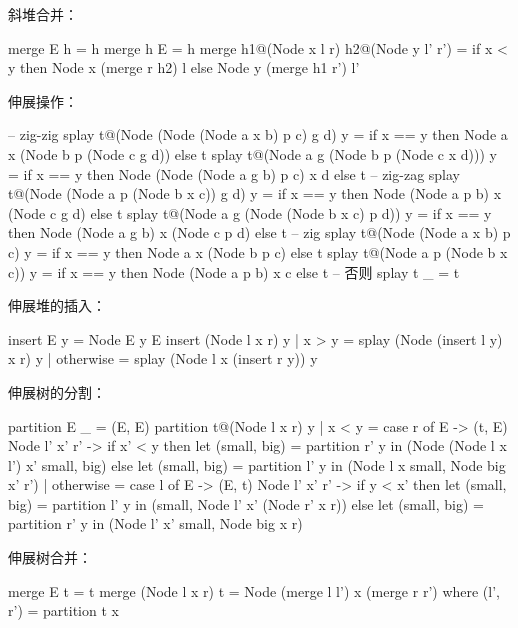 \documentclass[b5paper]{ctexart}
\begin{document}
斜堆合并：

\begin{Haskell}
merge E h = h
merge h E = h
merge h1@(Node x l r) h2@(Node y l' r') =
    if x < y then Node x (merge r h2) l
    else Node y (merge h1 r') l'
\end{Haskell}

伸展操作：

\begin{Haskell}
-- zig-zig
splay t@(Node (Node (Node a x b) p c) g d) y =
    if x == y then Node a x (Node b p (Node c g d)) else t
splay t@(Node a g (Node b p (Node c x d))) y =
    if x == y then Node (Node (Node a g b) p c) x d else t
-- zig-zag
splay t@(Node (Node a p (Node b x c)) g d) y =
    if x == y then Node (Node a p b) x (Node c g d) else t
splay t@(Node a g (Node (Node b x c) p d)) y =
    if x == y then Node (Node a g b) x (Node c p d) else t
-- zig
splay t@(Node (Node a x b) p c) y = if x == y then Node a x (Node b p c) else t
splay t@(Node a p (Node b x c)) y = if x == y then Node (Node a p b) x c else t
-- 否则
splay t _ = t
\end{Haskell}

伸展堆的插入：

\begin{Haskell}
insert E y = Node E y E
insert (Node l x r) y
    | x > y     = splay (Node (insert l y) x r) y
    | otherwise = splay (Node l x (insert r y)) y
\end{Haskell}

伸展树的分割：

\begin{Haskell}
partition E _ = (E, E)
partition t@(Node l x r) y
    | x < y =
        case r of
          E -> (t, E)
          Node l' x' r' ->
              if x' < y then
                  let (small, big) = partition r' y in
                  (Node (Node l x l') x' small, big)
              else
                  let (small, big) = partition l' y in
                  (Node l x small, Node big x' r')
    | otherwise =
        case l of
          E -> (E, t)
          Node l' x' r' ->
              if y < x' then
                  let (small, big) = partition l' y in
                  (small, Node l' x' (Node r' x r))
              else
                  let (small, big) = partition r' y in
                  (Node l' x' small, Node big x r)
\end{Haskell}

伸展树合并：

\begin{Haskell}
merge E t = t
merge (Node l x r) t = Node (merge l l') x (merge r r')
    where (l', r') = partition t x
\end{Haskell}
\end{document}
